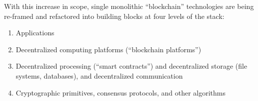 With this increase in scope, single monolithic ``blockchain'' technologies are being re-framed and refactored into building blocks at four levels of the stack:
\begin{enumerate}
 \item Applications
 \item Decentralized computing platforms (``blockchain platforms'')
 \item Decentralized processing (``smart contracts'') and decentralized storage (file systems, databases), and decentralized communication
 \item Cryptographic primitives, consensus protocols, and other algorithms
\end{enumerate}


